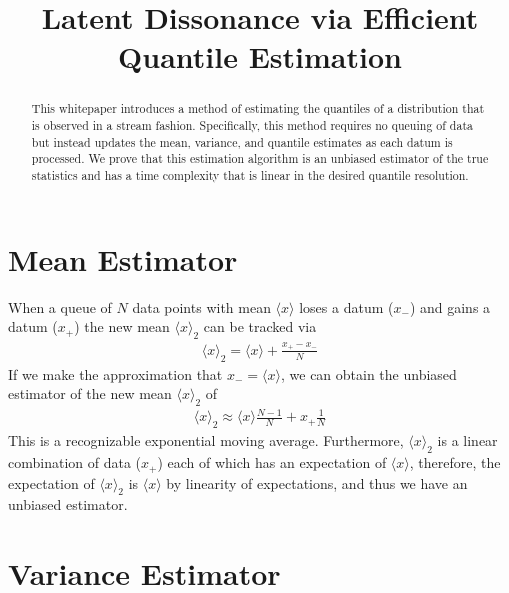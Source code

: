 \documentclass[conference]{IEEEtran}
\begin{document}
\title{Latent Dissonance via Efficient Quantile Estimation}

\author{
\IEEEauthorblockA{}
\and
{}
\IEEEauthorblockA{}}

\maketitle

\begin{abstract}
This whitepaper introduces a method of estimating the quantiles of a distribution that is observed in a stream fashion. Specifically, this method requires no queuing of data but instead updates the mean, variance, and quantile estimates as each datum is processed. We prove that this estimation algorithm is an unbiased estimator of the true statistics and has a time complexity that is linear in the desired quantile resolution.
\end{abstract}

\section{Mean Estimator}

When a queue of $N$ data points with mean $\langle x \rangle$ loses a datum ($x_{-}$) and gains a datum ($x_{+}$) the new mean $\langle x \rangle_{2}$ can be tracked via
\begin{align}
\langle x \rangle_{2} = \langle x \rangle + \frac{x_{+} - x_{-}}{N}
\end{align}
If we make the approximation that $x_{-}=\langle x \rangle$, we can obtain the unbiased estimator of the new mean $\langle x \rangle_{2}$ of
\begin{align}
\langle x \rangle_{2} \approx \langle x \rangle \frac{N-1}{N} + x_{+}\frac{1}{N}
\end{align}
This is a recognizable exponential moving average. Furthermore, $\langle x \rangle_{2}$ is a linear combination of data ($x_{+}$) each of which has an expectation of $\langle x \rangle$, therefore, the expectation of $\langle x \rangle_{2}$ is $\langle x \rangle$ by linearity of expectations, and thus we have an unbiased estimator.
\section{Variance Estimator}
\end{document}
